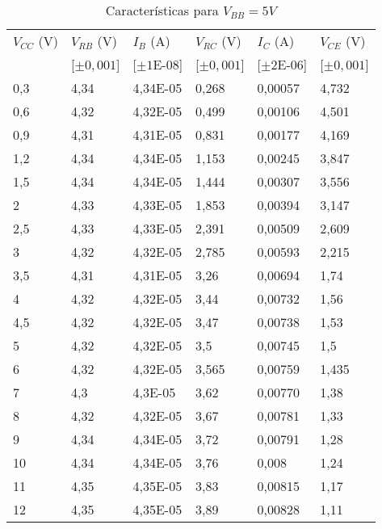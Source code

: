 \documentclass[a4paper,12pt,spanish]{article}
\begin{document}
\begin{table}[H]
	\centering
	\begin{tabular}{|l|l|l|l|l|l|}
		\hline
		$V_{CC}$ (V) & $V_{RB}$ (V)   & $I_B$ (A)     & $V_{RC}$ (V)  & $I_C$ (A)    & $V_{CE}$ (V)  \\ 
&[$\pm0,001$] &[$\pm1$E-08] &[$\pm0,001$] &[$\pm2$E-06]  &[$\pm0,001$]\\\hline
		0,3   & 4,34  & 4,34E-05 & 0,268 & 0,00057 & 4,732 \\ \hline
		0,6   & 4,32  & 4,32E-05 & 0,499 & 0,00106 & 4,501 \\ \hline
		0,9   & 4,31  & 4,31E-05 & 0,831 & 0,00177 & 4,169 \\ \hline
		1,2   & 4,34  & 4,34E-05 & 1,153 & 0,00245 & 3,847 \\ \hline
		1,5   & 4,34  & 4,34E-05 & 1,444 & 0,00307 & 3,556 \\ \hline
		2     & 4,33  & 4,33E-05 & 1,853 & 0,00394 & 3,147 \\ \hline
		2,5   & 4,33  & 4,33E-05 & 2,391 & 0,00509 & 2,609 \\ \hline
		3     & 4,32  & 4,32E-05 & 2,785 & 0,00593 & 2,215 \\ \hline
		3,5   & 4,31  & 4,31E-05 & 3,26  & 0,00694 & 1,74  \\ \hline
		4     & 4,32  & 4,32E-05 & 3,44  & 0,00732 & 1,56  \\ \hline
		4,5   & 4,32  & 4,32E-05 & 3,47  & 0,00738 & 1,53  \\ \hline
		5     & 4,32  & 4,32E-05 & 3,5   & 0,00745 & 1,5   \\ \hline
		6     & 4,32  & 4,32E-05 & 3,565 & 0,00759 & 1,435 \\ \hline
		7     & 4,3   & 4,3E-05  & 3,62  & 0,00770 & 1,38  \\ \hline
		8     & 4,32  & 4,32E-05 & 3,67  & 0,00781 & 1,33  \\ \hline
		9     & 4,34  & 4,34E-05 & 3,72  & 0,00791 & 1,28  \\ \hline
		10    & 4,34  & 4,34E-05 & 3,76  & 0,008   & 1,24  \\ \hline
		11    & 4,35  & 4,35E-05 & 3,83  & 0,00815 & 1,17  \\ \hline
		12    & 4,35  & 4,35E-05 & 3,89  & 0,00828 & 1,11  \\ \hline
	\end{tabular}
	\caption{Características para $V_{BB} = 5 \si{V}$}
	\label{tab:my-table}
\end{table}
\end{document}
